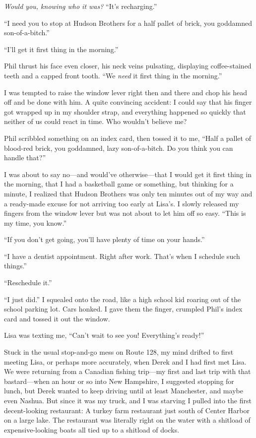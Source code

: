 \emph{Would you, knowing who it was?} ``It's recharging.''

``I need you to stop at Hudson Brothers for a half pallet of brick, you
goddamned son-of-a-bitch.''

``I'll get it first thing in the morning.''

Phil thrust his face even closer, his neck veins pulsating, displaying
coffee-stained teeth and a capped front tooth. ``We \emph{need} it first
thing in the morning.''

I was tempted to raise the window lever right then and there and chop
his head off and be done with him. A quite convincing accident: I could
say that his finger got wrapped up in my shoulder strap, and everything
happened so quickly that neither of us could react in time. Who wouldn't
believe me?

Phil scribbled something on an index card, then tossed it to me, ``Half
a pallet of blood-red brick, you goddamned, lazy son-of-a-bitch. Do you
think you can handle that?''

I was about to say no---and would've otherwise---that I would get it
first thing in the morning, that I had a basketball game or something,
but thinking for a minute, I realized that Hudson Brothers was only ten
minutes out of my way and a ready-made excuse for not arriving too early
at Lisa's. I slowly released my fingers from the window lever but was
not about to let him off so easy. ``This is my time, you know.''

``If you don't get going, you'll have plenty of time on your hands.''

``I have a dentist appointment. Right after work. That's when I schedule
such things.''

``Reschedule it.''

``I just did.'' I squealed onto the road, like a high school kid roaring
out of the school parking lot. Cars honked. I gave them the finger,
crumpled Phil's index card and tossed it out the window.

Lisa was texting me, ``Can't wait to see you! Everything's ready!''

Stuck in the usual stop-and-go mess on Route 128, my mind drifted to
first meeting Lisa, or perhaps more accurately, when Derek and I had
first met Lisa. We were returning from a Canadian fishing trip---my
first and last trip with that bastard---when an hour or so into New
Hampshire, I suggested stopping for lunch, but Derek wanted to keep
driving until at least Manchester, and maybe even Nashua. But since it
was my truck, and I was starving I pulled into the first decent-looking
restaurant: A turkey farm restaurant just south of Center Harbor on a
large lake. The restaurant was literally right on the water with a
shitload of expensive-looking boats all tied up to a shitload of docks.

